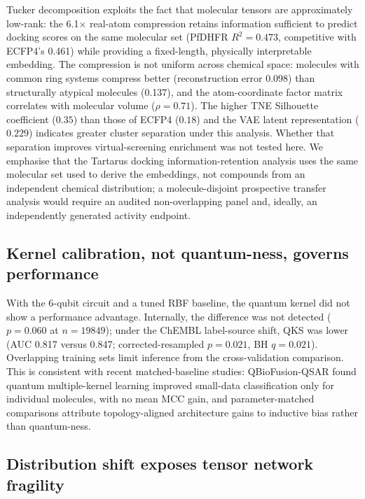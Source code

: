 \documentclass[11pt,a4paper]{article}
\begin{document}
Tucker decomposition exploits the fact that molecular tensors are approximately low-rank: the \num{6.1}$\times$ real-atom compression retains information sufficient to predict docking scores on the same molecular set (PfDHFR $R^2 = \num{0.473}$, competitive with ECFP4's \num{0.461}) while providing a fixed-length, physically interpretable embedding. The compression is not uniform across chemical space: molecules with common ring systems compress better (reconstruction error \num{0.098}) than structurally atypical molecules (\num{0.137}), and the atom-coordinate factor matrix correlates with molecular volume ($\rho = \num{0.71}$). The higher TNE Silhouette coefficient ($\num{0.35}$) than those of ECFP4 ($\num{0.18}$) and the VAE latent representation ($\num{0.229}$) indicates greater cluster separation under this analysis. Whether that separation improves virtual-screening enrichment was not tested here. We emphasise that the Tartarus docking information-retention analysis uses the same molecular set used to derive the embeddings, not compounds from an independent chemical distribution; a molecule-disjoint prospective transfer analysis would require an audited non-overlapping panel and, ideally, an independently generated activity endpoint.

\subsection{Kernel calibration, not quantum-ness, governs performance}

With the 6-qubit circuit and a tuned RBF baseline, the quantum kernel did not show a performance advantage. Internally, the difference was not detected ($p = \num{0.060}$ at $n = \num{19849}$); under the ChEMBL label-source shift, QKS was lower (AUC \num{0.817} versus \num{0.847}; corrected-resampled $p = \num{0.021}$, BH $q = \num{0.021}$). Overlapping training sets limit inference from the cross-validation comparison. This is consistent with recent matched-baseline studies: QBioFusion-QSAR \citep{qbiofusion_2026} found quantum multiple-kernel learning improved small-data classification only for individual molecules, with no mean MCC gain, and parameter-matched comparisons \citep{iso_qgnn_2026} attribute topology-aligned architecture gains to inductive bias rather than quantum-ness.

\subsection{Distribution shift exposes tensor network fragility}
\end{document}
